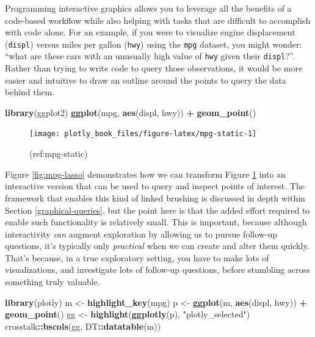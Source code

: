 \documentclass[
  12pt,
]{krantz}
\newenvironment{Shaded}{\begin{snugshade}}{\end{snugshade}}
\newcommand{\KeywordTok}[1]{\textcolor[rgb]{0.13,0.29,0.53}{\textbf{#1}}}
\newcommand{\NormalTok}[1]{#1}
\newcommand{\OperatorTok}[1]{\textcolor[rgb]{0.81,0.36,0.00}{\textbf{#1}}}
\newcommand{\StringTok}[1]{\textcolor[rgb]{0.31,0.60,0.02}{#1}}
\begin{document}
Programming interactive graphics allows you to leverage all the benefits of a code-based workflow while also helping with tasks that are difficult to accomplish with code alone. For an example, if you were to visualize engine displacement (\texttt{displ}) versus miles per gallon (\texttt{hwy}) using the \texttt{mpg} dataset, you might wonder: ``what are these cars with an unusually high value of \texttt{hwy} given their \texttt{displ}?''. Rather than trying to write code to query those observations, it would be more easier and intuitive to draw an outline around the points to query the data behind them.

\begin{Shaded}
\begin{Highlighting}[]
\KeywordTok{library}\NormalTok{(ggplot2)}
\KeywordTok{ggplot}\NormalTok{(mpg, }\KeywordTok{aes}\NormalTok{(displ, hwy)) }\OperatorTok{+}\StringTok{ }\KeywordTok{geom_point}\NormalTok{()}
\end{Highlighting}
\end{Shaded}

\begin{figure}

{\centering \texttt{[image: plotly\_book\_files/figure-latex/mpg-static-1]} 

}

\caption{(ref:mpg-static)}\label{fig:mpg-static}
\end{figure}

Figure \ref{fig:mpg-lasso} demonstrates how we can transform Figure \ref{fig:mpg-static} into an interactive version that can be used to query and inspect points of interest. The framework that enables this kind of linked brushing is discussed in depth within Section \ref{graphical-queries}, but the point here is that the added effort required to enable such functionality is relatively small. This is important, because although interactivity \emph{can} augment exploration by allowing us to pursue follow-up questions, it's typically only \emph{practical} when we can create and alter them quickly. That's because, in a true exploratory setting, you have to make lots of visualizations, and investigate lots of follow-up questions, before stumbling across something truly valuable.

\begin{Shaded}
\begin{Highlighting}[]
\KeywordTok{library}\NormalTok{(plotly)}
\NormalTok{m <-}\StringTok{ }\KeywordTok{highlight_key}\NormalTok{(mpg)}
\NormalTok{p <-}\StringTok{ }\KeywordTok{ggplot}\NormalTok{(m, }\KeywordTok{aes}\NormalTok{(displ, hwy)) }\OperatorTok{+}\StringTok{ }\KeywordTok{geom_point}\NormalTok{()}
\NormalTok{gg <-}\StringTok{ }\KeywordTok{highlight}\NormalTok{(}\KeywordTok{ggplotly}\NormalTok{(p), }\StringTok{"plotly_selected"}\NormalTok{)}
\NormalTok{crosstalk}\OperatorTok{::}\KeywordTok{bscols}\NormalTok{(gg, DT}\OperatorTok{::}\KeywordTok{datatable}\NormalTok{(m))}
\end{Highlighting}
\end{Shaded}
\end{document}
